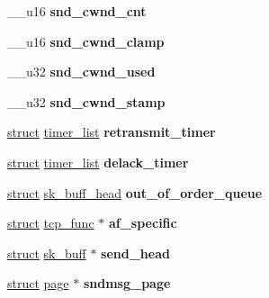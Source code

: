 \begin{DoxyCompactItemize}
\item 
\mbox{\label{structtcp__opt_a0feb40f012d07b988c9db9861314af8e}} 
\+\_\+\+\_\+u16 {\bfseries snd\+\_\+cwnd\+\_\+cnt}
\item 
\mbox{\label{structtcp__opt_ab3f2b0338162a7d5e16bed157d989a68}} 
\+\_\+\+\_\+u16 {\bfseries snd\+\_\+cwnd\+\_\+clamp}
\item 
\mbox{\label{structtcp__opt_aa2e69fc5bccafb8ae208291eb6b91a36}} 
\+\_\+\+\_\+u32 {\bfseries snd\+\_\+cwnd\+\_\+used}
\item 
\mbox{\label{structtcp__opt_afd9f541b1af240c262e690c0a8d56333}} 
\+\_\+\+\_\+u32 {\bfseries snd\+\_\+cwnd\+\_\+stamp}
\item 
\mbox{\label{structtcp__opt_a7d140fd327b9d1e00340dfec9331e1d5}} 
\hyperlink{interfacestruct}{struct} \hyperlink{structtimer__list}{timer\+\_\+list} {\bfseries retransmit\+\_\+timer}
\item 
\mbox{\label{structtcp__opt_a528eabade96073037db88e8272b1ad7b}} 
\hyperlink{interfacestruct}{struct} \hyperlink{structtimer__list}{timer\+\_\+list} {\bfseries delack\+\_\+timer}
\item 
\mbox{\label{structtcp__opt_aad5483a911430072676a9b190f3de71e}} 
\hyperlink{interfacestruct}{struct} \hyperlink{structsk__buff__head}{sk\+\_\+buff\+\_\+head} {\bfseries out\+\_\+of\+\_\+order\+\_\+queue}
\item 
\mbox{\label{structtcp__opt_af053ccc02117380c514fbdcd8afa447e}} 
\hyperlink{interfacestruct}{struct} \hyperlink{structtcp__func}{tcp\+\_\+func} $\ast$ {\bfseries af\+\_\+specific}
\item 
\mbox{\label{structtcp__opt_ad534ecbb4a9a4b00293db8a1b387ecb7}} 
\hyperlink{interfacestruct}{struct} \hyperlink{structsk__buff}{sk\+\_\+buff} $\ast$ {\bfseries send\+\_\+head}
\item 
\mbox{\label{structtcp__opt_a3d92628a93eda380ff49ba382cad899a}} 
\hyperlink{interfacestruct}{struct} \hyperlink{structpage}{page} $\ast$ {\bfseries sndmsg\+\_\+page}

\end{DoxyCompactItemize}
